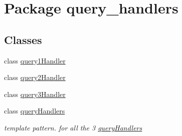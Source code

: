 \hypertarget{namespacequery__handlers}{}\section{Package query\+\_\+handlers}
\label{namespacequery__handlers}
\subsection*{Classes}
\begin{DoxyCompactItemize}
\item 
class \hyperlink{classquery__handlers_1_1query1_handler}{query1\+Handler}
\item 
class \hyperlink{classquery__handlers_1_1query2_handler}{query2\+Handler}
\item 
class \hyperlink{classquery__handlers_1_1query3_handler}{query3\+Handler}
\item 
class \hyperlink{classquery__handlers_1_1query_handlers}{query\+Handlers}
\begin{DoxyCompactList}\small\item\em template pattern. for all the 3 \hyperlink{classquery__handlers_1_1query_handlers}{query\+Handlers} \end{DoxyCompactList}\end{DoxyCompactItemize}
